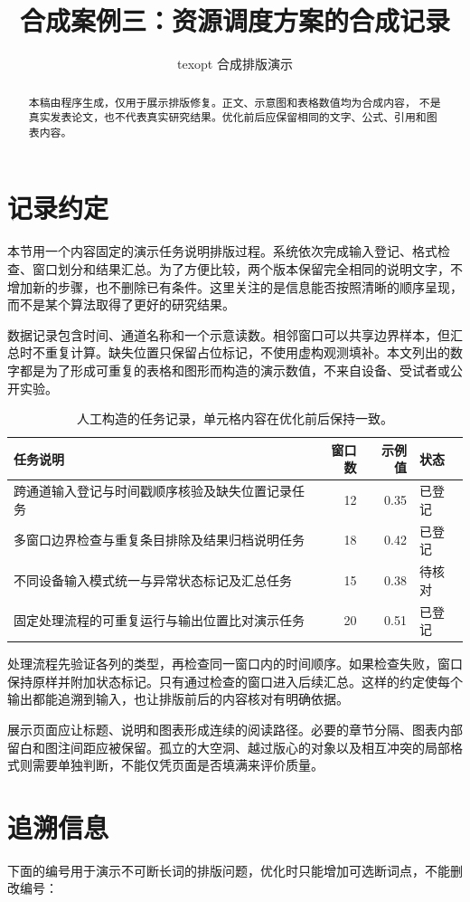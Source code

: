 \documentclass[UTF8,10pt,a4paper,fontset=windows]{ctexart}
\title{合成案例三：资源调度方案的合成记录}
\author{texopt 合成排版演示}
\date{}
\begin{document}
\maketitle
\begin{abstract}
本稿由程序生成，仅用于展示排版修复。正文、示意图和表格数值均为合成内容，
不是真实发表论文，也不代表真实研究结果。优化前后应保留相同的文字、公式、引用和图表内容。
\end{abstract}
\section{记录约定}
本节用一个内容固定的演示任务说明排版过程。系统依次完成输入登记、格式检查、窗口划分和结果汇总。为了方便比较，两个版本保留完全相同的说明文字，不增加新的步骤，也不删除已有条件。这里关注的是信息能否按照清晰的顺序呈现，而不是某个算法取得了更好的研究结果。

数据记录包含时间、通道名称和一个示意读数。相邻窗口可以共享边界样本，但汇总时不重复计算。缺失位置只保留占位标记，不使用虚构观测填补。本文列出的数字都是为了形成可重复的表格和图形而构造的演示数值，不来自设备、受试者或公开实验。

\begin{table}[h!]
\centering
\caption{人工构造的任务记录，单元格内容在优化前后保持一致。}
\label{tab:wide}
\begin{tabular}{lrrl}
\toprule
任务说明 & 窗口数 & 示例值 & 状态 \\
\midrule
跨通道输入登记与时间戳顺序核验及缺失位置记录任务 & 12 & 0.35 & 已登记 \\
多窗口边界检查与重复条目排除及结果归档说明任务 & 18 & 0.42 & 已登记 \\
不同设备输入模式统一与异常状态标记及汇总任务 & 15 & 0.38 & 待核对 \\
固定处理流程的可重复运行与输出位置比对演示任务 & 20 & 0.51 & 已登记 \\
\bottomrule
\end{tabular}
\end{table}
处理流程先验证各列的类型，再检查同一窗口内的时间顺序。如果检查失败，窗口保持原样并附加状态标记。只有通过检查的窗口进入后续汇总。这样的约定使每个输出都能追溯到输入，也让排版前后的内容核对有明确依据。

展示页面应让标题、说明和图表形成连续的阅读路径。必要的章节分隔、图表内部留白和图注间距应被保留。孤立的大空洞、越过版心的对象以及相互冲突的局部格式则需要单独判断，不能仅凭页面是否填满来评价质量。

\section{追溯信息}
下面的编号用于演示不可断长词的排版问题，优化时只能增加可选断词点，不能删改编号：
\end{document}
